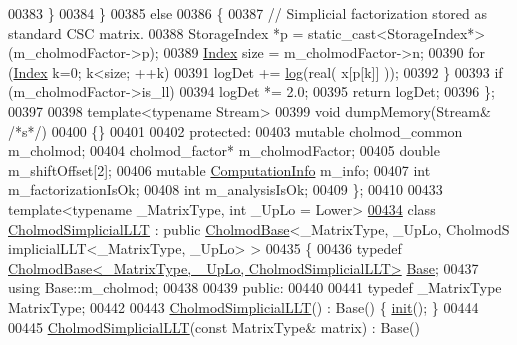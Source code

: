\begin{DoxyCode}
00383         \}
00384       \}
00385       \textcolor{keywordflow}{else}
00386       \{
00387         \textcolor{comment}{// Simplicial factorization stored as standard CSC matrix.}
00388         StorageIndex *p = \textcolor{keyword}{static\_cast<}StorageIndex*\textcolor{keyword}{>}(m\_cholmodFactor->p);
00389         \hyperlink{namespace_eigen_a62e77e0933482dafde8fe197d9a2cfde}{Index} size = m\_cholmodFactor->n;
00390         \textcolor{keywordflow}{for} (\hyperlink{namespace_eigen_a62e77e0933482dafde8fe197d9a2cfde}{Index} k=0; k<size; ++k)
00391           logDet += \hyperlink{structlog}{log}(real( x[p[k]] ));
00392       \}
00393       \textcolor{keywordflow}{if} (m\_cholmodFactor->is\_ll)
00394         logDet *= 2.0;
00395       \textcolor{keywordflow}{return} logDet;
00396     \};
00397 
00398     \textcolor{keyword}{template}<\textcolor{keyword}{typename} Stream>
00399     \textcolor{keywordtype}{void} dumpMemory(Stream& \textcolor{comment}{/*s*/})
00400     \{\}
00401     
00402   \textcolor{keyword}{protected}:
00403     \textcolor{keyword}{mutable} cholmod\_common m\_cholmod;
00404     cholmod\_factor* m\_cholmodFactor;
00405     \textcolor{keywordtype}{double} m\_shiftOffset[2];
00406     \textcolor{keyword}{mutable} \hyperlink{group__enums_ga85fad7b87587764e5cf6b513a9e0ee5e}{ComputationInfo} m\_info;
00407     \textcolor{keywordtype}{int} m\_factorizationIsOk;
00408     \textcolor{keywordtype}{int} m\_analysisIsOk;
00409 \};
00410 
00433 \textcolor{keyword}{template}<\textcolor{keyword}{typename} \_MatrixType, \textcolor{keywordtype}{int} \_UpLo = Lower>
\hyperlink{class_eigen_1_1_cholmod_simplicial_l_l_t}{00434} \textcolor{keyword}{class }\hyperlink{class_eigen_1_1_cholmod_simplicial_l_l_t}{CholmodSimplicialLLT} : \textcolor{keyword}{public} \hyperlink{class_eigen_1_1_cholmod_base}{CholmodBase}<\_MatrixType, \_UpLo, CholmodS
      implicialLLT<\_MatrixType, \_UpLo> >
00435 \{
00436     \textcolor{keyword}{typedef} \hyperlink{class_eigen_1_1_cholmod_base}{CholmodBase<\_MatrixType, \_UpLo, CholmodSimplicialLLT>}
       \hyperlink{class_eigen_1_1_cholmod_base}{Base};
00437     \textcolor{keyword}{using} Base::m\_cholmod;
00438     
00439   \textcolor{keyword}{public}:
00440     
00441     \textcolor{keyword}{typedef} \_MatrixType MatrixType;
00442     
00443     \hyperlink{class_eigen_1_1_cholmod_simplicial_l_l_t}{CholmodSimplicialLLT}() : Base() \{ \hyperlink{structinit}{init}(); \}
00444 
00445     \hyperlink{class_eigen_1_1_cholmod_simplicial_l_l_t}{CholmodSimplicialLLT}(\textcolor{keyword}{const} MatrixType& matrix) : Base()

\end{DoxyCode}
